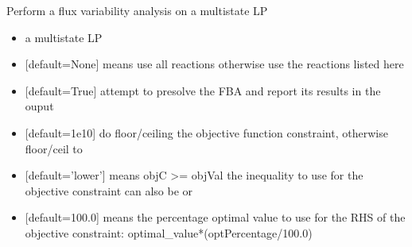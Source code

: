 \documentclass[letterpaper,10pt,english]{sphinxmanual}
\begin{document}

\begin{fulllineitems}
\label{\detokenize{modules_doc:cbmpy.CBCPLEX.cplx_MultiFluxVariabilityAnalysis}}
\pysigstartsignatures
{}
\pysigstopsignatures
\sphinxAtStartPar
Perform a flux variability analysis on a multistate LP
\begin{itemize}
\item {} 
\sphinxAtStartPar
{} a multistate LP

\item {} 
\sphinxAtStartPar
{} {[}default=None{]} means use all reactions otherwise use the reactions listed here

\item {} 
\sphinxAtStartPar
{} {[}default=True{]} attempt to presolve the FBA and report its results in the ouput

\item {} 
\sphinxAtStartPar
{}  {[}default=1e\sphinxhyphen{}10{]} do floor/ceiling the objective function constraint, otherwise floor/ceil to 

\item {} 
\sphinxAtStartPar
{} {[}default=’lower’{]} means objC \textgreater{}= objVal the inequality to use for the objective constraint can also be  or 

\item {} 
\sphinxAtStartPar
{} {[}default=100.0{]} means the percentage optimal value to use for the RHS of the objective constraint: optimal\_value*(optPercentage/100.0)


\end{itemize}
\end{fulllineitems}
\end{document}

